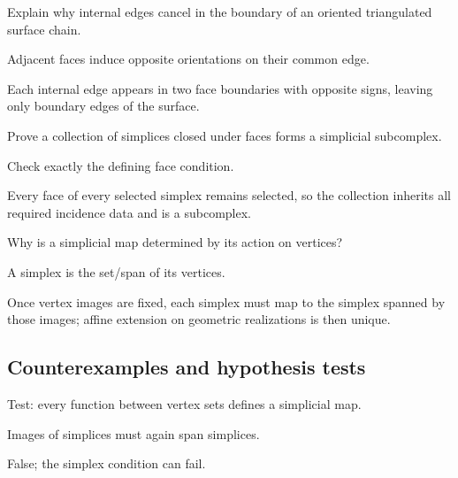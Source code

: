 \begin{exercise}\label{exr:viii15-ped-07}
Explain why internal edges cancel in the boundary of an oriented triangulated surface chain.
\end{exercise}
\begin{hint}
Adjacent faces induce opposite orientations on their common edge.
\end{hint}
\begin{solution}
Each internal edge appears in two face boundaries with opposite signs, leaving only boundary edges of the surface.
\end{solution}

\begin{exercise}\label{exr:viii15-ped-08}
Prove a collection of simplices closed under faces forms a simplicial subcomplex.
\end{exercise}
\begin{hint}
Check exactly the defining face condition.
\end{hint}
\begin{solution}
Every face of every selected simplex remains selected, so the collection inherits all required incidence data and is a subcomplex.
\end{solution}

\begin{exercise}\label{exr:viii15-ped-09}
Why is a simplicial map determined by its action on vertices?
\end{exercise}
\begin{hint}
A simplex is the set/span of its vertices.
\end{hint}
\begin{solution}
Once vertex images are fixed, each simplex must map to the simplex spanned by those images; affine extension on geometric realizations is then unique.
\end{solution}

\subsection*{Counterexamples and hypothesis tests}

\begin{exercise}\label{exr:viii15-ped-10}
Test: every function between vertex sets defines a simplicial map.
\end{exercise}
\begin{hint}
Images of simplices must again span simplices.
\end{hint}
\begin{solution}
False; the simplex condition can fail.
\end{solution}

